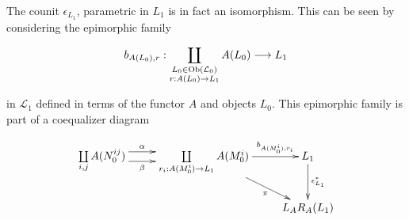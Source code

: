 \begin{frame}
The counit $\epsilon_{L_1}$, parametric in $L_1$ is in fact an isomorphism. This can be seen by considering the epimorphic family
\begin{block}{}
$$
b_{A(L_0),r} : \coprod\limits_{\substack{L_0 \in \mathop{\rm Ob}\nolimits(\mathcal{L}_0) \\ r:A(L_0) \rightarrow L_1}}
A(L_0) \longrightarrow L_1
$$
\end{block}
in $\mathcal{L}_1$ defined in terms of the functor $A$ and objects $L_0$. This epimorphic family is part of a coequalizer diagram
\begin{block}{}
\begin{displaymath}
\xymatrix{
\coprod\limits_{\substack{i,j}}
A(N_0^{ij})
\ar@<1ex>[r]^-{\alpha} \ar@<-1ex>[r]_-{\beta}
&
\coprod\limits_{\substack{r_i:A(M_0^i) \rightarrow L_1}}
A(M_0^i)
\ar[r]^-{b_{A(M_0^i),r_i}} \ar[dr]_-{\pi}
&
L_1 \ar[d]^-{\epsilon_{L_1}^*}\\
& & L_A R_A(L_1)
}
\end{displaymath}
\end{block}
\end{frame}